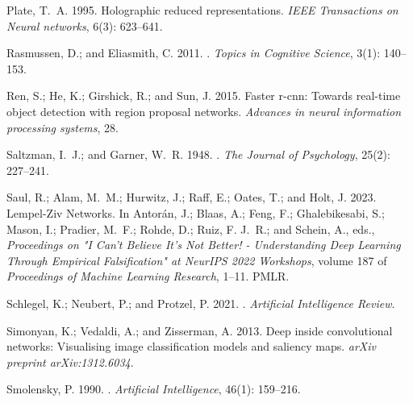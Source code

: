 \documentclass[letterpaper]{article} %
\begin{document}
\begin{thebibliography}{33}
    Plate, T.~A. 1995.
    \newblock Holographic reduced representations.
    \newblock \emph{IEEE Transactions on Neural networks}, 6(3): 623--641.
    
    Rasmussen, D.; and Eliasmith, C. 2011.
    .
    \newblock \emph{Topics in Cognitive Science}, 3(1): 140--153.
    
    Ren, S.; He, K.; Girshick, R.; and Sun, J. 2015.
    \newblock Faster r-cnn: Towards real-time object detection with region proposal
      networks.
    \newblock \emph{Advances in neural information processing systems}, 28.
    
    Saltzman, I.~J.; and Garner, W.~R. 1948.
    .
    \newblock \emph{The Journal of Psychology}, 25(2): 227--241.
    
    Saul, R.; Alam, M.~M.; Hurwitz, J.; Raff, E.; Oates, T.; and Holt, J. 2023.
    \newblock Lempel-Ziv Networks.
    \newblock In Antorán, J.; Blaas, A.; Feng, F.; Ghalebikesabi, S.; Mason, I.;
      Pradier, M.~F.; Rohde, D.; Ruiz, F. J.~R.; and Schein, A., eds.,
      \emph{Proceedings on "I Can't Believe It's Not Better! - Understanding Deep
      Learning Through Empirical Falsification" at NeurIPS 2022 Workshops}, volume
      187 of \emph{Proceedings of Machine Learning Research}, 1--11. PMLR.
    
    Schlegel, K.; Neubert, P.; and Protzel, P. 2021.
    .
    \newblock \emph{Artificial Intelligence Review}.
    
    Simonyan, K.; Vedaldi, A.; and Zisserman, A. 2013.
    \newblock Deep inside convolutional networks: Visualising image classification
      models and saliency maps.
    \newblock \emph{arXiv preprint arXiv:1312.6034}.
    
    Smolensky, P. 1990.
    .
    \newblock \emph{Artificial Intelligence}, 46(1): 159--216.
    

\end{thebibliography}
\end{document}
